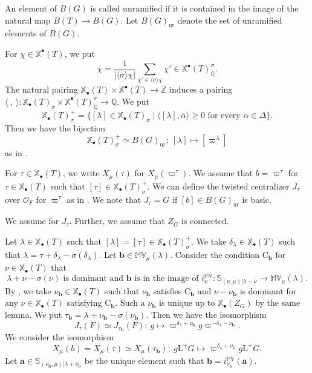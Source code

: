 \documentclass[12pt,a4paper]{article}
\newcommand{\bQ}{\mathbb{Q}}
\newcommand{\bS}{\mathbb{S}}
\newcommand{\bX}{\mathbb{X}}
\newcommand{\bZ}{\mathbb{Z}}
\newcommand{\bfa}{\mathbf{a}}
\newcommand{\bfb}{\mathbf{b}}
\newcommand{\cO}{\mathcal{O}}
\newcommand{\rL}{\mathrm{L}}
\newcommand{\ur}{\mathrm{ur}}
\newcommand{\ol}{\overline}
\newcommand{\bMV}{\mathbb{MV}}
\begin{document}
An element of $B(G)$ is called unramified if 
it is contained in the image of the natural map 
$B(T) \to B(G)$. 
Let $B(G)_{\ur}$ denote the set of unramified elements of $B(G)$. 

For $\chi \in \bX^{\bullet}(T)$, 
we put 
\[
 \ol{\chi} = \frac{1}{\lvert 
 \langle \sigma \rangle 
 \chi \rvert} \sum_{\chi' \in \langle \sigma \rangle  \chi} \chi' \in  \bX^{\bullet}(T)_{\bQ}^{\sigma} . 
\]
The natural pairing $\bX_{\bullet}(T) \times \bX^{\bullet}(T) \to \bZ$ induces a pairing 
$\langle \ , \ \rangle \colon \bX_{\bullet}(T)_{\sigma} \times \bX^{\bullet}(T)_{\bQ}^{\sigma} \to \bQ$. 
We put 
\[
 \bX_{\bullet}(T)_{\sigma}^+ = 
 \{ [\lambda] \in \bX_{\bullet}(T)_{\sigma} \mid \textrm{$\langle [\lambda] , \ol{\alpha} \rangle \geq 0$ for every  $\alpha \in \Delta$} \}. 
\]
Then we have the bijection 
\[
 \bX_{\bullet}(T)_{\sigma}^+ \simeq 
 B(G)_{\ur};\ [\lambda] \mapsto [\varpi^{\lambda}] 
\]
as in \cite[Lemma 4.2.3]{XiZhCycSh}. 

For $\tau \in \bX_{\bullet}(T)$, we write 
$X_{\mu} (\tau)$ for $X_{\mu} (\varpi^{\tau})$. 
We assume that $b=\varpi^{\tau}$ 
for $\tau \in \bX_{\bullet}(T)$ 
such that $[\tau] \in \bX_{\bullet}(T)_{\sigma}^+$. 
We can define the twisted centralizer $J_{\tau}$ over $\cO_F$ 
for $\varpi^{\tau}$ 
as in \cite[4.2.13]{XiZhCycSh}. 
We note that $J_{\tau}=G$ if $[b] \in B(G)_{\ur}$ is basic. 


We assume \cite[Hypothesis 4.4.1]{XiZhCycSh} for $J_{\tau}$. 
Further, we assume that $Z_G$ is connected. 

Let $\lambda \in  \bX_{\bullet}(T)$ such that 
$[\lambda]=[\tau] \in \bX_{\bullet}(T)_{\sigma}^+$. 
We take $\delta_{\lambda} \in \bX_{\bullet}(T)$ 
such that 
$\lambda =\tau +\delta_{\lambda} -\sigma (\delta_{\lambda})$. 
Let $\bfb \in \bMV_{\mu}(\lambda)$. 
Consider the condition $\textrm{C}_{\bfb}$ for $\nu \in \bX_{\bullet}(T)$ that 
\[
\textrm{$\lambda +\nu -\sigma (\nu)$ is dominant and $\bfb$ is in the image of $i_{\nu}^{\bMV} \colon \bS_{(\nu,\mu)|\lambda +\nu} \to \bMV_{\mu} (\lambda)$.} 
\]
By \cite[Lemma 4.4.3]{XiZhCycSh}, we take $\nu_{\bfb} \in \bX_{\bullet}(T)$ such that $\nu_{\bfb}$ satisfies $\textrm{C}_{\bfb}$ and $\nu -\nu_{\bfb}$ is dominant for any $\nu \in \bX_{\bullet}(T)$ satisfying $\textrm{C}_{\bfb}$. Such a $\nu_{\bfb}$ is unique up to $\bX_{\bullet}(Z_G)$ by the same lemma. 
We put $\tau_{\bfb} =\lambda +\nu_{\bfb} -\sigma (\nu_{\bfb})$. 
Then we have the isomorphism 
\[
 J_{\tau} (F) \simeq J_{\tau_{\bfb}} (F);\ 
 g \mapsto \varpi^{\delta_{\lambda} +\nu_{\bfb}} g 
 \varpi^{-\delta_{\lambda} -\nu_{\bfb}}. 
\]
We consider the isomorphism 
\begin{equation}\label{eq:ttbiso}
 X_{\mu} (b) = 
 X_{\mu} (\tau) \simeq X_{\mu} (\tau_{\bfb}) ; \ 
 g \rL^+ G \mapsto  
 \varpi^{\delta_{\lambda} +\nu_{\bfb}} 
 g \rL^+ G . 
\end{equation}
Let $\bfa \in \bS_{(\nu_{\bfb},\mu)|\lambda +\nu_{\bfb}}$ 
be the unique element such that 
$\bfb =i_{\nu_{\bfb}}^{\bMV} (\bfa)$. 
\end{document}
